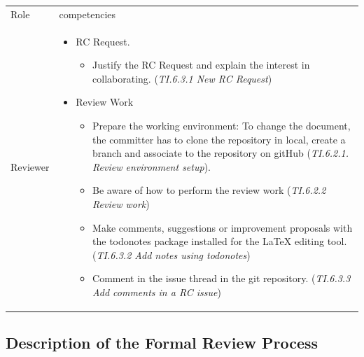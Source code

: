 \documentclass{template/openetcs_article}
\begin{document}
\begin{flushleft}

\begin{tabular}{|m{3cm}|m{11cm}|}
\hline
\rowcolor{myblue}
\multicolumn{2}{|c|}{Roles} \\\hline
\rowcolor{lightgray}
Role &
competencies 
\\\hline
Reviewer &
\begin{itemize}
\item RC Request.
\begin{itemize}
\item Justify the RC Request and explain the interest in collaborating. ({\it TI.6.3.1 New RC Request})
\end{itemize}
\item Review Work
\begin{itemize}
\item Prepare the working environment: To change the document, the committer has to clone the repository in local, create a branch and associate to the repository on gitHub ({\it TI.6.2.1. Review environment setup}).
\item Be aware of how to perform the review work ({\it TI.6.2.2 Review work})
\item Make comments, suggestions or improvement proposals with the todonotes package installed for the LaTeX editing tool. ({\it TI.6.3.2 Add notes using todonotes})
\item Comment in the issue thread in the git repository. ({\it TI.6.3.3 Add comments in a RC issue})
\end{itemize}
\end{itemize}
\\\hline
\end{tabular}
\end{flushleft}

\subsection{Description of the Formal Review Process}


\end{document}
